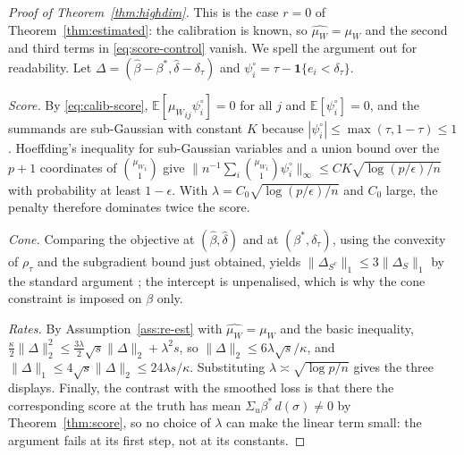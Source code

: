 \documentclass[12pt,a4paper]{article}
\theoremstyle{definition}
\theoremstyle{remark}
\newcommand{\E}{\mathbb{E}}
\newcommand{\ind}[1]{\mathbf{1}\{#1\}}
\newcommand{\betas}{\beta^*}
\newcommand{\muv}{\mu_W}
\begin{document}
\begin{proof}[Proof of Theorem~\ref{thm:highdim}]
This is the case $r=0$ of Theorem~\ref{thm:estimated}: the calibration is known, so
$\hat{\muv}=\muv$ and the second and third terms in \eqref{eq:score-control} vanish. We spell
the argument out for readability. Let $\Delta=(\hat\beta-\betas,\hat\delta-\delta_\tau)$ and
$\psi_i^\circ=\tau-\ind{e_i<\delta_\tau}$.

\emph{Score.} By \eqref{eq:calib-score}, $\E[{\muv}_{ij}\psi_i^\circ]=0$ for all $j$ and
$\E[\psi_i^\circ]=0$, and the summands are sub-Gaussian with constant $K$ because
$|\psi_i^\circ|\le\max(\tau,1-\tau)\le1$. Hoeffding's inequality for sub-Gaussian
variables and a union bound over the $p+1$ coordinates of
$\binom{{\muv}_i}{1}$ give
$\|n^{-1}\sum_i\binom{{\muv}_i}{1}\psi_i^\circ\|_\infty\le CK\sqrt{\log(p/\epsilon)/n}$ with
probability at least $1-\epsilon$. With $\lambda=C_0\sqrt{\log(p/\epsilon)/n}$ and $C_0$
large, the penalty therefore dominates twice the score.

\emph{Cone.} Comparing the objective at $(\hat\beta,\hat\delta)$ and at
$(\betas,\delta_\tau)$, using the convexity of $\rho_\tau$ and the subgradient bound just
obtained, yields $\|\Delta_{S^c}\|_1\le3\|\Delta_S\|_1$ by the standard argument
\citep[Lemma 3]{belloni2011l1}; the intercept is unpenalised, which is why the cone
constraint is imposed on $\beta$ only.

\emph{Rates.} By Assumption~\ref{ass:re-est} with $\hat{\muv}=\muv$ and the basic inequality,
$\frac{\kappa}{2}\|\Delta\|_2^2\le\frac{3\lambda}{2}\sqrt s\|\Delta\|_2+\lambda^2s$, so
$\|\Delta\|_2\le6\lambda\sqrt s/\kappa$, and
$\|\Delta\|_1\le4\sqrt s\|\Delta\|_2\le24\lambda s/\kappa$. Substituting
$\lambda\asymp\sqrt{\log p/n}$ gives the three displays. Finally, the contrast with the
smoothed loss is that there the corresponding score at the truth has mean
$\Sigma_u\betas\,d(\sigma)\neq0$ by Theorem~\ref{thm:score}, so no choice of $\lambda$ can
make the linear term small: the argument fails at its first step, not at its constants.
\end{proof}
\end{document}
